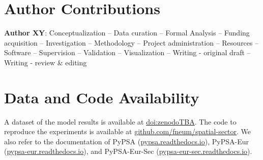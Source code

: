 \documentclass[12pt,1p]{elsarticle}
\begin{document}
\section*{Author Contributions}


\textbf{Author XY}:
Conceptualization --
Data curation --
Formal Analysis --
Funding acquisition --
Investigation --
Methodology --
Project administration --
Resources --
Software --
Supervision --
Validation --
Visualization --
Writing - original draft --
Writing - review \& editing


\section*{Data and Code Availability}

A dataset of the model results is available at \href{zenodoTBA}{doi:zenodoTBA}.
The code to reproduce the experiments is available at \href{https://github.com/fneum/spatial-sector}{github.com/fneum/spatial-sector}.
We also refer to the documentation of PyPSA (\href{https://pypsa.readthedocs.io}{pypsa.readthedocs.io}),
PyPSA-Eur (\href{https://pypsa-eur.readthedocs.io}{pypsa-eur.readthedocs.io}), and
PyPSA-Eur-Sec (\href{https://pypsa-eur-sec.readthedocs.io}{pypsa-eur-sec.readthedocs.io}).

\renewcommand{\ttdefault}{\sfdefault}
%



\newpage

\makeatletter
\renewcommand \thesection{S\@arabic\c@section}
\renewcommand\thetable{S\@arabic\c@table}
\renewcommand \thefigure{S\@arabic\c@figure}
\makeatother

\renewcommand{\citenumfont}[1]{S#1}

\setcounter{equation}{0}
\setcounter{figure}{0}
\setcounter{table}{0}
\setcounter{section}{0}



\renewcommand{\ttdefault}{\sfdefault}
\end{document}
